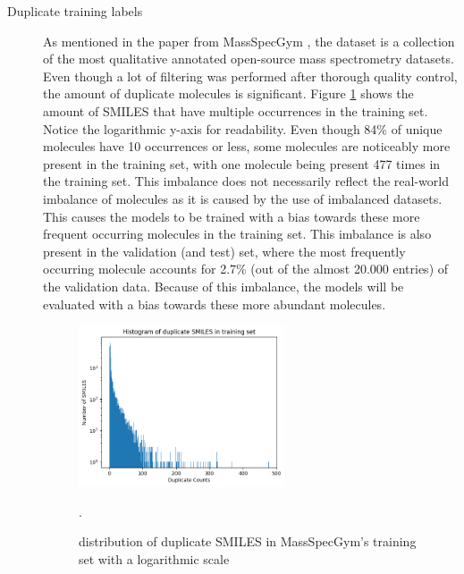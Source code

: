 \begin{description}
    \item[Duplicate training labels]
            As mentioned in the paper from MassSpecGym \cite{bushuiev2024massspecgym}, the dataset is a collection of the most qualitative annotated open-source mass spectrometry datasets.
            Even though a lot of filtering was performed after thorough quality control, the amount of duplicate molecules is significant.
            Figure \ref{fig:duplicate_smiles} shows the amount of SMILES that have multiple occurrences in the training set. Notice the logarithmic y-axis for readability.
            Even though 84\% of unique molecules have 10 occurrences or less, some molecules are noticeably more present in the training set, with one molecule being present 477 times in the training set.
            This imbalance does not necessarily reflect the real-world imbalance of molecules as it is caused by the use of imbalanced datasets.
            This causes the models to be trained with a bias towards these more frequent occurring molecules in the training set.
            This imbalance is also present in the validation (and test) set, where the most frequently occurring molecule accounts for 2.7\% (out of the almost 20.000 entries) of the validation data.
            Because of this imbalance, the models will be evaluated with a bias towards these more abundant molecules.
    \begin{figure}[h]
        \centering
        \includegraphics[width=0.6\textwidth]{figures/discussion/duplicate_smiles_training_set.png}
        \caption{distribution of duplicate SMILES in MassSpecGym's training set with a logarithmic scale}.
        \label{fig:duplicate_smiles}
    \end{figure}


\end{description}
